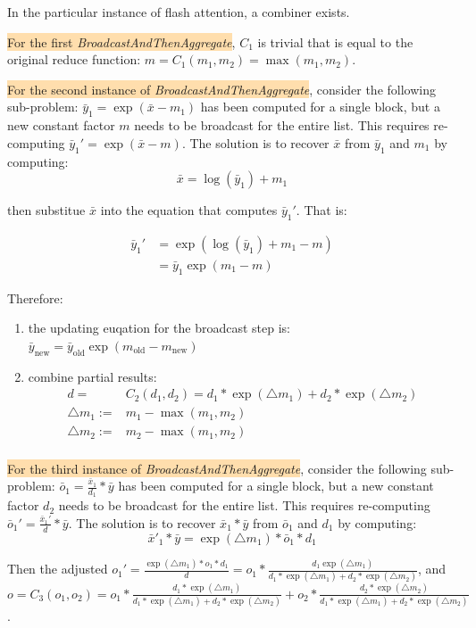 In the particular instance of flash attention, a combiner exists.

\colorbox{NavajoWhite}{For the first \textit{BroadcastAndThenAggregate}}, $C_1$ is trivial that is equal to the original reduce function: $m = C_1(m_1, m_2) = \max(m_1, m_2)$.

\colorbox{NavajoWhite}{For the second instance of \textit{BroadcastAndThenAggregate}}, consider the following sub-problem:
$\bar{y}_1=\exp(\bar{x}-m_1)$ has been computed for a single block,
but a new constant factor $m$ needs to be broadcast for the entire list.
This requires re-computing $\bar{y}_1' = \exp(\bar{x}-m)$.
The solution is to recover $\bar{x}$ from $\bar{y}_1$ and $m_1$ by computing: $$\bar{x}= \log(\bar{y}_1) + m_1$$

then substitue $\bar{x}$ into the equation that computes $\bar{y}_1'$. That is:

\begin{align*}
\bar{y}_1' &= \exp\left(\log \left(\bar{y}_1\right) + m_1 -m \right) \\
&= \bar{y}_1\exp(m_1 - m)
\end{align*}

Therefore:
\begin{enumerate}
\item the updating euqation for the broadcast step is: $\bar{y}_{\text{new}}=\bar{y}_{\text{old}}\exp(m_\text{old}-m_{\text{new}})$
\item combine partial results: 
\begin{align*}
   d=&C_2(d_1,d_2) = d_1 * \exp(\triangle m_1) + d_2 * \exp(\triangle m_2) \\
   \triangle m_1 :=&m_1 - \max(m_1, m_2) \\
   \triangle m_2 :=&m_2 -\max(m_1, m_2) \\
\end{align*}
\end{enumerate}

\colorbox{NavajoWhite}{For the third instance of \textit{BroadcastAndThenAggregate}}, consider the following sub-problem:
$\bar{o}_1=\frac{\bar{x}_1}{d_1}*\bar{y}$ has been computed for a single block,
but a new constant factor $d_2$ needs to be broadcast for the entire list.
This requires re-computing $\bar{o}_1' = \frac{\bar{x}_1'}{d}*\bar{y}$.
The solution is to recover $\bar{x}_1*\bar{y}$ from $\bar{o}_1$ and $d_1$ by computing: $$\bar{x}'_1 * \bar{y}= \exp(\triangle m_1)*\bar{o}_1 * d_1$$

Then the adjusted $o_1'=\frac{\exp(\triangle m_1)*o_1*d_1}{d} = o_1 *\frac{d_1 \exp({\triangle m_1})}{d_1 * \exp(\triangle m_1) + d_2 * \exp(\triangle m_2)}$, and $o = C_3(o_1, o_2) = o_1 * \frac{d_1 * \exp(\triangle m_1)}{d_1 * \exp(\triangle m_1) + d_2 * \exp(\triangle m_2)} + o_2 * \frac{d_2*\exp(\triangle m_2)}{d_1 * \exp(\triangle m_1) + d_2 * \exp(\triangle m_2)}$.



